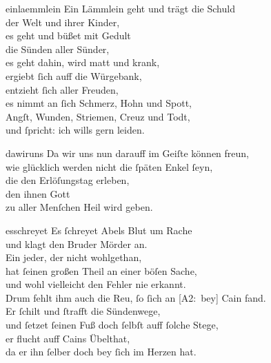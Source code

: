 \documentclass[abbrwidth=6em,tocstyle=ref-genre]{ees}
\newcommand\altlyrics[1]{[\textmd{A2}:~#1]}
\begin{document}
{\clearpage
\begin{movement}{einlaemmlein}
  \voice[Chor]
  Ein Lämmlein geht und trägt die Schuld\\
  der Welt und ihrer Kinder,\\
  es geht und büßet mit Gedult\\
  die Sünden aller Sünder,\\
  es geht dahin, wird matt und krank,\\
  ergiebt ſich auff die Würgebank,\\
  entzieht ſich aller Freuden,\\
  es nimmt an ſich Schmerz, Hohn und Spott,\\
  Angſt, Wunden, Striemen, Creuz und Todt,\\
  und ſpricht: ich wills gern leiden.
\end{movement}

\begin{movement}{dawiruns}
  \voice[Adam]
  Da wir uns nun darauff im Geiſte können freun,\\
  wie glücklich werden nicht die ſpäten Enkel ſeyn,\\
  die den Erlöſungstag erleben,\\
  den ihnen Gott\\
  zu aller Menſchen Heil wird geben.
\end{movement}

\begin{movement}{esschreyet}
  \voice[Chor]
  Es ſchreyet Abels Blut um Rache\\
  und klagt den Bruder Mörder an.\\
  Ein jeder, der nicht wohlgethan,\\
  hat ſeinen großen Theil an einer böſen Sache,\\
  und wohl vielleicht den Fehler nie erkannt.\\
  Drum fehlt ihm auch die Reu, ſo ſich an \altlyrics{bey} Cain fand.\\
  Er ſchilt und ſtrafft die Sündenwege,\\
  und ſetzet ſeinen Fuß doch ſelbſt auff ſolche Stege,\\
  er flucht auff Cains Übelthat,\\
  da er ihn ſelber doch bey ſich im Herzen hat.
\end{movement}
}

\eesScore
\end{document}
